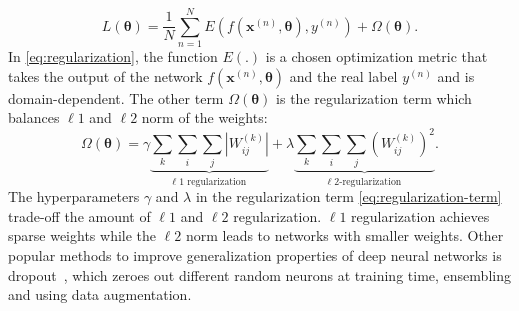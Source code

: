 \documentclass[\home/main.tex]{subfiles}
\begin{document}
\begin{equation}\label{eq:regularization}
	L(\boldsymbol{\theta})=\frac{1}{N} \sum_{n=1}^{N} E\left(f\left(\boldsymbol{x}^{(n)}, \boldsymbol{\theta}\right), y^{(n)}\right)+\Omega(\boldsymbol{\theta}).
\end{equation}
In \cref{eq:regularization}, the function $E(.)$ is a chosen optimization metric that takes the output of the network $f\left(\boldsymbol{x}^{(n)}, \boldsymbol{\theta}\right)$ and the real label $y^{(n)}$ and is domain-dependent. The other term $\Omega(\boldsymbol{\theta})$ is the regularization term which balances $\ell 1$ and $\ell 2$ norm of the weights:
\begin{equation} \label{eq:regularization-term}
	\Omega(\boldsymbol{\theta})=\gamma \underbrace{\sum_{k} \sum_{i} \sum_{j}\left|W_{i j}^{(k)}\right|}_{\ell 1 \text { regularization }}+\lambda \underbrace{\sum_{k} \sum_{i} \sum_{j}\left(W_{i j}^{(k)}\right)^{2}}_{\ell 2 \text {-regularization }}.
\end{equation}
The hyperparameters $\gamma$ and $\lambda$ in the regularization term \cref{eq:regularization-term} trade-off the amount of $\ell 1$ and $\ell 2$ regularization. $\ell 1$ regularization achieves sparse weights while the $\ell 2$ norm leads to networks with smaller weights. Other popular methods to improve generalization properties of deep neural networks is dropout~\autocite{dropout}, which zeroes out different random neurons at training time, ensembling and using data augmentation.
\end{document}
